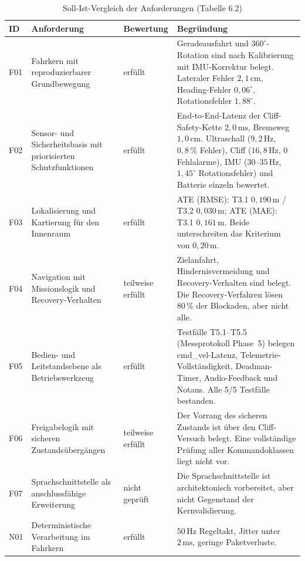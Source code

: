 \begin{table}[htbp]
  \centering
  \caption{Soll-Ist-Vergleich der Anforderungen (Tabelle 6.2)}
  \small
  \begin{tabularx}{\textwidth}{l L l L}
    \toprule
    \textbf{ID} & \textbf{Anforderung} & \textbf{Bewertung} & \textbf{Begründung} \\
    \midrule
    F01 & Fahrkern mit reproduzierbarer Grundbewegung & erfüllt & Geradeausfahrt und $360^\circ$-Rotation sind nach Kalibrierung mit IMU-Korrektur belegt. Lateraler Fehler $2{,}1\,\mathrm{cm}$, Heading-Fehler $0{,}06^\circ$, Rotationsfehler $1{,}88^\circ$. \\
    \addlinespace
    F02 & Sensor- und Sicherheitsbasis mit priorisierten Schutzfunktionen & erfüllt & End-to-End-Latenz der Cliff-Safety-Kette $2{,}0\,\mathrm{ms}$, Bremsweg $1{,}0\,\mathrm{cm}$. Ultraschall ($9{,}2\,\mathrm{Hz}$, $0{,}8\,\%$ Fehler), Cliff ($16{,}8\,\mathrm{Hz}$, $0$ Fehlalarme), IMU ($30$--$35\,\mathrm{Hz}$, $1{,}45^\circ$ Rotationsfehler) und Batterie einzeln bewertet. \\
    \addlinespace
    F03 & Lokalisierung und Kartierung für den Innenraum & erfüllt & ATE (RMSE): T3.1 $0{,}190\,\mathrm{m}$ / T3.2 $0{,}030\,\mathrm{m}$; ATE (MAE): T3.1 $0{,}161\,\mathrm{m}$. Beide unterschreiten das Kriterium von $0{,}20\,\mathrm{m}$. \\
    \addlinespace
    F04 & Navigation mit Missionslogik und Recovery-Verhalten & teilweise erfüllt & Zielanfahrt, Hindernisvermeidung und Recovery-Verhalten sind belegt. Die Recovery-Verfahren lösen $80\,\%$ der Blockaden, aber nicht alle. \\
    \addlinespace
    F05 & Bedien- und Leitstandsebene als Betriebswerkzeug & erfüllt & Testfälle T5.1--T5.5 (Messprotokoll Phase~5) belegen cmd\_vel-Latenz, Telemetrie-Vollständigkeit, Deadman-Timer, Audio-Feedback und Notaus. Alle 5/5 Testfälle bestanden. \\
    \addlinespace
    F06 & Freigabelogik mit sicheren Zustandsübergängen & teilweise erfüllt & Der Vorrang des sicheren Zustands ist über den Cliff-Versuch belegt. Eine vollständige Prüfung aller Kommandoklassen liegt nicht vor. \\
    \addlinespace
    F07 & Sprachschnittstelle als anschlussfähige Erweiterung & nicht geprüft & Die Sprachschnittstelle ist architektonisch vorbereitet, aber nicht Gegenstand der Kernvalidierung. \\
    \addlinespace
    N01 & Deterministische Verarbeitung im Fahrkern & erfüllt & $50\,\mathrm{Hz}$ Regeltakt, Jitter unter $2\,\mathrm{ms}$, geringe Paketverluste. \\

\end{tabularx}
\end{table}
